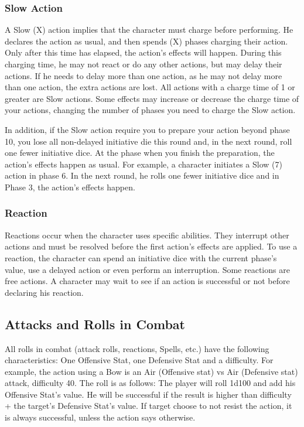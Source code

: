 \begin{multicols}{2}
\subsubsection{Slow Action}
A Slow (X) action implies that the character must charge before performing. He declares the action as usual, and then spends (X) phases charging their action. Only after this time has elapsed, the action’s effects will happen. During this charging time, he may not react or do any other actions, but may delay their actions. If he needs to delay more than one action, as he may not delay more than one action, the extra actions are lost. All actions with a charge time of 1 or greater are Slow actions. Some effects may increase or decrease the charge time of your actions, changing the number of phases you need to charge the Slow action.

In addition, if the Slow action require you to prepare your action beyond phase 10, you lose all non-delayed initiative die this round and, in the next round, roll one fewer initiative dice. At the phase when you finish the preparation, the action’s effects happen as usual. For example, a character initiates a Slow (7) action in phase 6. In the next round, he rolls one fewer initiative dice and in Phase 3, the action’s effects happen.

\subsubsection{Reaction}
Reactions occur when the character uses specific abilities. They interrupt other actions and must be resolved before the first action’s effects are applied. To use a reaction, the character can spend an initiative dice with the current phase’s value, use a delayed action or even perform an interruption. Some reactions are free actions. A character may wait to see if an action is successful or not before declaring his reaction.

\subsection{Attacks and Rolls in Combat}\label{subsec:attacks}
All rolls in combat (attack rolls, reactions, Spells, etc.) have the following characteristics: One Offensive Stat, one Defensive Stat and a difficulty. For example, the  action using a Bow is an Air (Offensive stat) vs Air (Defensive stat) attack, difficulty 40. The roll is as follows: The player will roll 1d100 and add his Offensive Stat’s value. He will be successful if the result is higher than difficulty + the target’s Defensive Stat’s value. If target choose to not resist the action, it is always successful, unless the action says otherwise.


\end{multicols}
